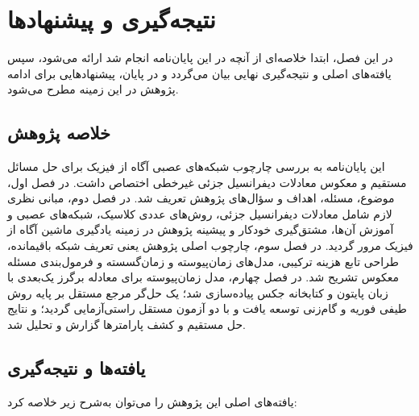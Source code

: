 \chapter{نتیجه‌گیری و پیشنهادها}
\label{ch:conclusion}

در این فصل، ابتدا خلاصه‌ای از آنچه در این پایان‌نامه انجام شد ارائه می‌شود،
سپس یافته‌های اصلی و نتیجه‌گیری نهایی بیان می‌گردد و در پایان، پیشنهادهایی
برای ادامه پژوهش در این زمینه مطرح می‌شود.

\section{خلاصه پژوهش}
\label{sec:summary}

این پایان‌نامه به بررسی چارچوب شبکه‌های عصبی آگاه از فیزیک برای حل مسائل
مستقیم و معکوس معادلات دیفرانسیل جزئی غیرخطی اختصاص داشت. در فصل اول،
موضوع، مسئله، اهداف و سؤال‌های پژوهش تعریف شد. در فصل دوم، مبانی نظری لازم
شامل معادلات دیفرانسیل جزئی، روش‌های عددی کلاسیک، شبکه‌های عصبی و آموزش
آن‌ها، مشتق‌گیری خودکار و پیشینه پژوهش در زمینه یادگیری ماشین آگاه از
فیزیک مرور گردید. در فصل سوم، چارچوب اصلی پژوهش یعنی تعریف شبکه باقیمانده،
طراحی تابع هزینه ترکیبی، مدل‌های زمان‌پیوسته و زمان‌گسسته و فرمول‌بندی
مسئله معکوس تشریح شد. در فصل چهارم، مدل زمان‌پیوسته برای معادله برگرز
یک‌بعدی با زبان پایتون و کتابخانه جکس پیاده‌سازی شد؛ یک حل‌گر مرجع مستقل
بر پایه روش طیفی فوریه و گام‌زنی  توسعه یافت و با دو آزمون
مستقل راستی‌آزمایی گردید؛ و نتایج حل مستقیم و کشف پارامترها گزارش و تحلیل
شد.

\section{یافته‌ها و نتیجه‌گیری}
\label{sec:findings}

یافته‌های اصلی این پژوهش را می‌توان به‌شرح زیر خلاصه کرد:


